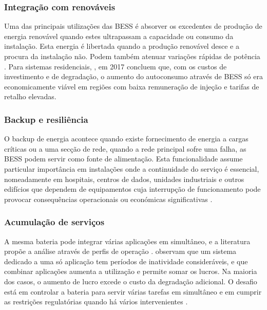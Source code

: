 \subsubsection{Integração com renováveis }
\label{sec:Ch2.1.6.4}

Uma das principais utilizações das BESS é absorver os excedentes de produção de energia renovável quando estes ultrapassam a capacidade ou consumo da instalação. Esta energia é libertada quando a produção renovável desce e a procura da instalação não. Podem também atenuar variações rápidas de potência \cite{ Prakash2022}\cite{ Ratshitanga2024}. Para sistemas residenciais, \cite{ Hesse2017}, em 2017 concluem que, com os custos de investimento e de degradação, o aumento do autoconsumo através de BESS só era economicamente viável em regiões com baixa remuneração de injeção e tarifas de retalho elevadas.



\subsubsection{Backup e resiliência }
\label{sec:Ch2.1.6.5}

O backup de energia acontece quando existe fornecimento de energia a cargas críticas ou a uma secção de rede, quando a rede principal sofre uma falha, as BESS podem servir como fonte de alimentação.
Esta funcionalidade assume particular importância em instalações onde a continuidade do serviço é essencial, nomeadamente em hospitais, centros de dados, unidades industriais e outros edifícios que dependem de equipamentos cuja interrupção de funcionamento pode provocar consequências operacionais ou económicas significativas \cite{ Prakash2022}\cite{ Marchgraber2020}. 

\subsubsection{Acumulação de serviços}
\label{sec:Ch2.1.6.6}

A mesma bateria pode integrar várias aplicações em simultâneo, e a literatura propõe a análise através de perfis de operação \cite{ Zhao2023}. \textcite{ Hesse2017} observam que um sistema dedicado a uma só aplicação tem períodos de inatividade consideráveis, e que combinar aplicações aumenta a utilização e permite somar os lucros. Na maioria dos casos, o aumento de lucro excede o custo da degradação adicional. O desafio está em controlar a bateria para servir várias tarefas em simultâneo e em cumprir as restrições regulatórias quando há vários intervenientes \cite{ Hesse2017}. 


